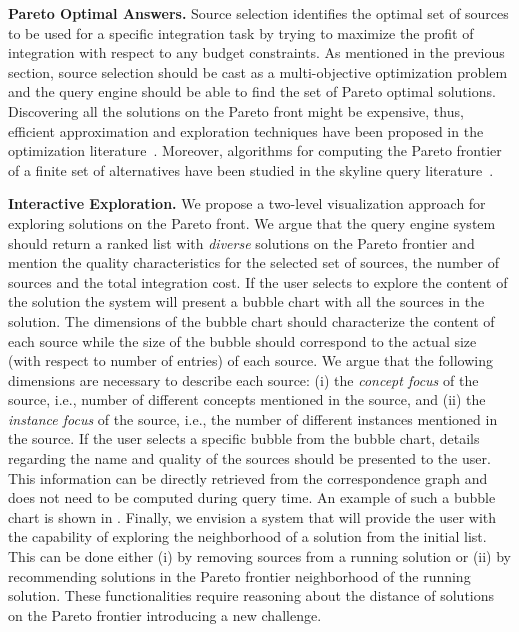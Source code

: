 \documentclass{sig-alternate}
\begin{document}
\vspace{3pt}\noindent\textbf{Pareto Optimal Answers.} Source selection identifies the optimal set of sources to be used for a specific integration task by trying to maximize the profit of integration with respect to any budget constraints. As mentioned in the previous section, source selection should be cast as a multi-objective optimization problem and the query engine should be able to find the set of Pareto optimal solutions. Discovering all the solutions on the Pareto front might be expensive, thus, efficient approximation and exploration techniques have been proposed in the optimization literature~\cite{wilson:2001}. Moreover, algorithms for computing the Pareto frontier of a finite set of alternatives have been studied in the skyline query literature~\cite{godfrey:2007,kossmann:2002}. 

\vspace{3pt}\noindent\textbf{Interactive Exploration.} We propose a two-level visualization approach for exploring solutions on the Pareto front.  We argue that the query engine system should return a ranked list with {\em diverse} solutions on the Pareto frontier and mention the quality characteristics for the selected set of sources, the number of sources and the total integration cost. If the user selects to explore the content of the solution the system will present a bubble chart with all the sources in the solution. The dimensions of the bubble chart should characterize the content of each source while the size of the bubble should correspond to the actual size (with respect to number of entries) of each source. We argue that the following dimensions are necessary to describe each source: (i) the {\em concept focus} of the source, i.e., number of different concepts mentioned in the source, and (ii) the {\em instance focus} of the source, i.e., the number of different instances mentioned in the source. If the user selects a specific bubble from the bubble chart, details regarding the name and quality of the sources should be presented to the user. This information can be directly retrieved from the correspondence graph and does not need to be computed during query time. An example of such a bubble chart is shown in . Finally, we envision a system that will provide the user with the capability of exploring the neighborhood of a solution from the initial list. This can be done either (i) by removing sources from a running solution or (ii) by recommending solutions in the Pareto frontier neighborhood of the running solution. These functionalities require reasoning about the distance of solutions on the Pareto frontier introducing a new challenge.
\end{document}

